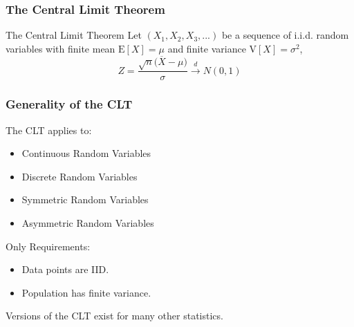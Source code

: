 \documentclass[12pt, block=fill]{beamer}
\newcommand{\E}{\text{E}}
\newcommand{\V}{\text{V}}
\begin{document}
\begin{frame}
  \frametitle{The Central Limit Theorem}
  \begin{block}{The Central Limit Theorem}
    Let $(X_1,X_2,X_3,...)$ be a sequence of i.i.d. random variables with finite mean $\E[X] = \mu$ and finite variance $\V[X] = \sigma^2$,
    $$
    Z =    \frac{\sqrt{n}\big(\overline{X} - \mu\big)}{\sigma}  \overset{d}{\to} N(0,1)
    $$
  \end{block}
\end{frame}

\begin{frame}
  \frametitle{Generality of the CLT}
The CLT applies to:
    \begin{itemize}
    \item Continuous Random Variables
    \item Discrete Random Variables
    \item Symmetric Random Variables
    \item Asymmetric Random Variables
  \end{itemize}
 Only Requirements:
 \begin{itemize}
\item Data points are IID.
\item Population has finite variance.
\end{itemize}
Versions of the CLT exist for many other statistics.

\end{frame}
\end{document}

